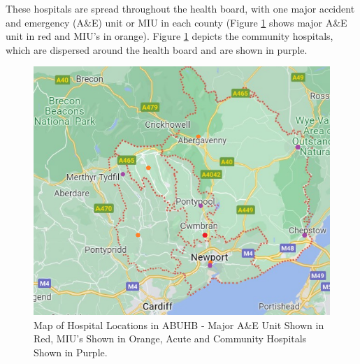 \documentclass[../thesis.tex]{subfiles}
\begin{document}
\begin{table}[h!]
    \centering{}
    \caption{Type and Names of Hospitals Located in ABUHB}
    \label{tab:hospitals}
\end{table}

These hospitals are spread throughout the health board, with one major accident and emergency (A\&E) unit or MIU in each county (Figure \ref{fig:abuhblocations1} shows major A\&E unit in red and MIU's in orange). Figure \ref{fig:abuhblocations1} depicts the community hospitals, which are dispersed around the health board and are shown in purple.

\begin{figure}[h!]
    \centering
    \includegraphics[scale=0.8]{Chapters/Chapter1/Figures/ABUHBmap2.png}
    \caption{Map of Hospital Locations in ABUHB - Major A\&E Unit Shown in Red, MIU's Shown in Orange, Acute and Community Hospitals Shown in Purple.}
    \label{fig:abuhblocations1}
\end{figure}
\end{document}

